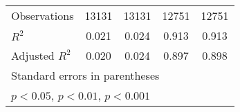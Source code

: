 {\begin{tabular}{l*{4}{c}}
\hline
Observations        &       13131         &       13131         &       12751         &       12751         \\
\(R^{2}\)           &       0.021         &       0.024         &       0.913         &       0.913         \\
Adjusted \(R^{2}\)  &       0.020         &       0.024         &       0.897         &       0.898         \\
\hline\hline
\multicolumn{5}{l}{\footnotesize Standard errors in parentheses}\\
\multicolumn{5}{l}{\footnotesize \sym{*} \(p<0.05\), \sym{**} \(p<0.01\), \sym{***} \(p<0.001\)}\\
\end{tabular}
}
